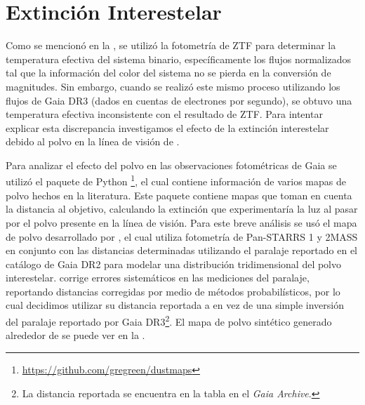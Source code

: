 \section{Extinción Interestelar}

Como se mencionó en la
, se
utilizó la fotometría de ZTF para determinar la temperatura efectiva del sistema
binario, específicamente los flujos normalizados tal que la información del
color del sistema no se pierda en la conversión de magnitudes. Sin embargo,
cuando se realizó este mismo proceso utilizando los flujos de Gaia DR3 (dados en
cuentas de electrones por segundo), se obtuvo una temperatura efectiva
inconsistente con el resultado de ZTF. Para intentar explicar esta discrepancia
investigamos el efecto de la extinción interestelar debido al polvo en la línea
de visión de \atoObjIdNoSpace.

Para analizar el efecto del polvo en las observaciones fotométricas de Gaia se
utilizó el paquete de Python
\footnote{\url{https://github.com/gregreen/dustmaps}}, el cual
contiene información de varios mapas de polvo hechos en la literatura. Este
paquete contiene mapas que toman en cuenta la distancia al objetivo, calculando
la extinción que experimentaría la luz al pasar por el polvo presente en la
línea de visión. Para este breve análisis se usó el mapa de polvo desarrollado
por , el cual utiliza
fotometría de Pan-STARRS 1 y 2MASS en conjunto con las distancias determinadas
utilizando el paralaje reportado en el catálogo de Gaia DR2 para modelar una
distribución tridimensional del polvo interestelar.
 corrige errores
sistemáticos en las mediciones del paralaje, reportando distancias corregidas
por medio de métodos probabilísticos, por lo cual decidimos utilizar su
distancia reportada a \atoObjId en vez de una simple inversión del paralaje
reportado por Gaia DR3\footnote{La distancia reportada se encuentra en la tabla
 en el \textit{Gaia Archive}.}. El mapa de polvo
sintético generado alrededor de \atoObjId se puede ver en la
.

